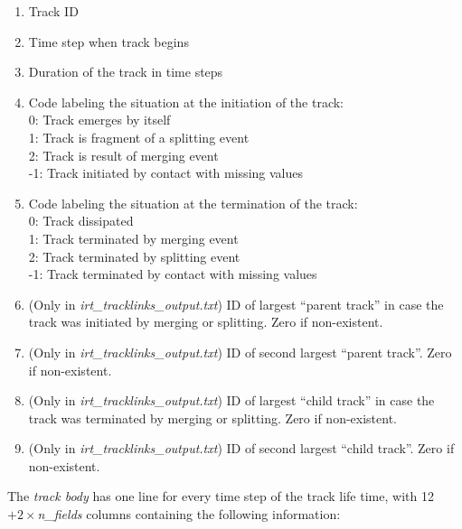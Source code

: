 \documentclass[11pt]{article}
\begin{document}
\begin{enumerate}
\item Track ID
\item Time step when track begins
\item Duration of the track in time steps
\item Code labeling the situation at the initiation of the track:\\
0: Track emerges by itself\\
1: Track is fragment of a splitting event\\
2: Track is result of merging event\\
-1: Track initiated by contact with missing values
\item Code labeling the situation at the termination of the track:\\
0: Track dissipated\\
1: Track terminated by merging event\\
2: Track terminated by splitting event\\
-1: Track terminated by contact with missing values
\item (Only in {\it irt\_tracklinks\_output.txt}) ID of largest ``parent track'' in case the track was initiated by merging or splitting. Zero if non-existent.
\item (Only in {\it irt\_tracklinks\_output.txt}) ID of second largest ``parent track''. Zero if non-existent.
\item (Only in {\it irt\_tracklinks\_output.txt}) ID of largest ``child track'' in case the track was terminated by merging or splitting. Zero if non-existent.
\item (Only in {\it irt\_tracklinks\_output.txt}) ID of second largest ``child track''. Zero if non-existent.
\end{enumerate}
The {\it track body} has one line for every time step of the track life time, with 12$+2\times${\it n\_fields} columns containing the following information:
\end{document}
